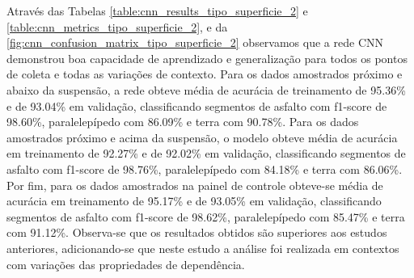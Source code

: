 Através das Tabelas \ref{table:cnn_results_tipo_superficie_2} e \ref{table:cnn_metrics_tipo_superficie_2}, e da \autoref{fig:cnn_confusion_matrix_tipo_superficie_2} observamos que a rede CNN demonstrou boa capacidade de aprendizado e generalização para todos os pontos de coleta e todas as variações de contexto. Para os dados amostrados próximo e abaixo da suspensão, a rede obteve média de acurácia de treinamento de 95.36\% e de 93.04\% em validação, classificando segmentos de asfalto com f1-score de 98.60\%, paralelepípedo com 86.09\% e terra com 90.78\%. Para os dados amostrados próximo e acima da suspensão, o modelo obteve média de acurácia em treinamento de 92.27\% e de 92.02\% em validação, classificando segmentos de asfalto com f1-score de 98.76\%, paralelepípedo com 84.18\% e terra com 86.06\%. Por fim, para os dados amostrados na painel de controle obteve-se média de acurácia em treinamento de 95.17\% e de 93.05\% em validação, classificando segmentos de asfalto com f1-score de 98.62\%, paralelepípedo com 85.47\% e terra com 91.12\%. Observa-se que os resultados obtidos são superiores aos estudos anteriores, adicionando-se que neste estudo a análise foi realizada em contextos com variações das propriedades de dependência.